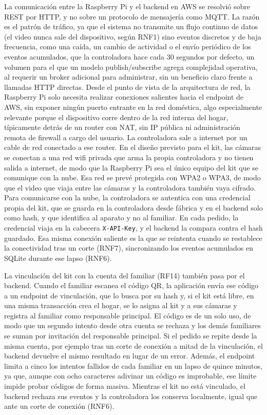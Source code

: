 La comunicación entre la Raspberry Pi y el backend en AWS se resolvió sobre REST por HTTP, y no sobre un protocolo de mensajería como MQTT.
La razón es el patrón de tráfico, ya que el sistema no transmite un flujo continuo de datos (el video nunca sale del dispositivo, según RNF1) sino eventos discretos y de baja frecuencia, como una caída, un cambio de actividad o el envío periódico de los eventos acumulados, que la controladora hace cada 30 segundos por defecto, un volumen para el que un modelo publish/subscribe agrega complejidad operativa, al requerir un broker adicional para administrar, sin un beneficio claro frente a llamadas HTTP directas.
Desde el punto de vista de la arquitectura de red, la Raspberry Pi solo necesita realizar conexiones salientes hacia el endpoint de AWS, sin exponer ningún puerto entrante en la red doméstica, algo especialmente relevante porque el dispositivo corre dentro de la red interna del hogar, típicamente detrás de un router con NAT, sin IP pública ni administración remota de firewall a cargo del usuario.
La controladora sale a internet por un cable de red conectado a ese router.
En el diseño previsto para el kit, las cámaras se conectan a una red wifi privada que arma la propia controladora y no tienen salida a internet, de modo que la Raspberry Pi sea el único equipo del kit que se comunique con la nube.
Esa red se prevé protegida con WPA2 o WPA3, de modo que el video que viaja entre las cámaras y la controladora también vaya cifrado.
Para comunicarse con la nube, la controladora se autentica con una credencial propia del kit, que se guarda en la controladora desde fábrica y en el backend solo como hash, y que identifica al aparato y no al familiar.
En cada pedido, la credencial viaja en la cabecera \texttt{X-API-Key}, y el backend la compara contra el hash guardado.
Esa misma conexión saliente es la que se reintenta cuando se restablece la conectividad tras un corte (RNF7), sincronizando los eventos acumulados en SQLite durante ese lapso (RNF6).

La vinculación del kit con la cuenta del familiar (RF14) también pasa por el backend.
Cuando el familiar escanea el código QR, la aplicación envía ese código a un endpoint de vinculación, que lo busca por su hash y, si el kit está libre, en una misma transacción crea el hogar, se lo asigna al kit y a sus cámaras y registra al familiar como responsable principal.
El código es de un solo uso, de modo que un segundo intento desde otra cuenta se rechaza y los demás familiares se suman por invitación del responsable principal.
Si el pedido se repite desde la misma cuenta, por ejemplo tras un corte de conexión a mitad de la vinculación, el backend devuelve el mismo resultado en lugar de un error.
Además, el endpoint limita a cinco los intentos fallidos de cada familiar en un lapso de quince minutos, ya que, aunque con ocho caracteres adivinar un código es improbable, ese límite impide probar códigos de forma masiva.
Mientras el kit no está vinculado, el backend rechaza sus eventos y la controladora los conserva localmente, igual que ante un corte de conexión (RNF6).

